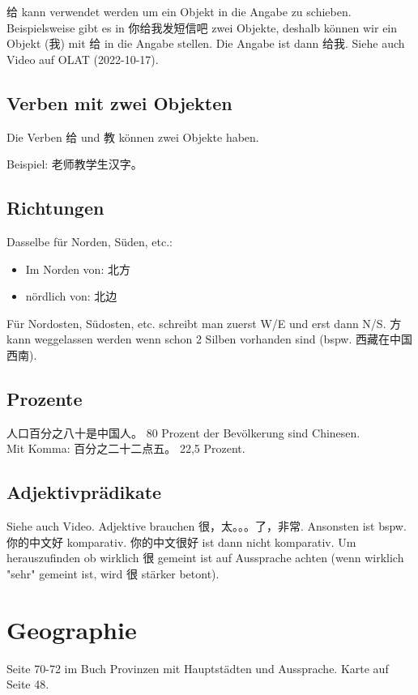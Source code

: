 \documentclass[UTF8]{ctexart}
\begin{document}
给 kann verwendet werden um ein Objekt in die Angabe zu schieben. Beispielsweise gibt es in 你给我发短信吧 zwei Objekte, deshalb können wir ein Objekt (我) mit 给 in die Angabe stellen. Die Angabe ist dann 给我. Siehe auch Video auf OLAT (2022-10-17).

\subsection{Verben mit zwei Objekten}

Die Verben 给 und 教 können zwei Objekte haben.

Beispiel: 老师教学生汉字。

\subsection{Richtungen}

Dasselbe für Norden, Süden, etc.:

\begin{itemize}
    \item Im Norden von: 北方
    \item nördlich von: 北边
\end{itemize}

Für Nordosten, Südosten, etc. schreibt man zuerst W/E und erst dann N/S. 方 kann weggelassen werden wenn schon 2 Silben vorhanden sind (bspw. 西藏在中国西南).

\subsection{Prozente}

人口百分之八十是中国人。 80 Prozent der Bevölkerung sind Chinesen.\\
Mit Komma: 百分之二十二点五。 22,5 Prozent.

\subsection{Adjektivprädikate}

Siehe auch Video. Adjektive brauchen 很，太。。。了，非常. Ansonsten ist bspw. 你的中文好 komparativ. 你的中文很好 ist dann nicht komparativ. Um herauszufinden ob wirklich 很 gemeint ist auf Aussprache achten (wenn wirklich "sehr" gemeint ist, wird 很 stärker betont).

\section{Geographie}

Seite 70-72 im Buch Provinzen mit Hauptstädten und Aussprache. Karte auf Seite 48.
\end{document}
